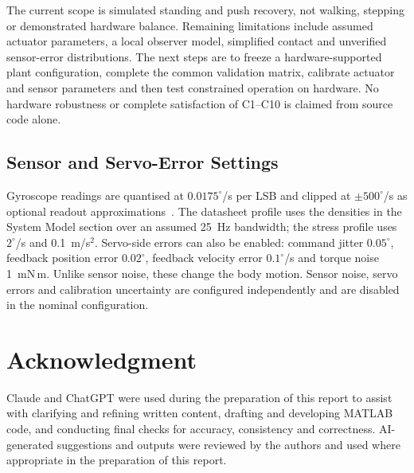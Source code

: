 \documentclass[conference,a4paper]{IEEEtran}
\begin{document}
The current scope is simulated standing and push recovery, not walking,
stepping or demonstrated hardware balance. Remaining limitations include
assumed actuator parameters, a local observer model, simplified contact and
unverified sensor-error distributions. The next steps are to freeze a
hardware-supported plant configuration, complete the common validation
matrix, calibrate actuator and sensor parameters and then test constrained
operation on hardware. No hardware robustness or complete satisfaction of
C1--C10 is claimed from source code alone.

\appendix
\subsection{Sensor and Servo-Error Settings}\label{app:sensors}
Gyroscope readings are quantised at $0.0175^\circ$/s per LSB and clipped at $\pm500^\circ$/s as optional readout approximations~\cite{openmicroduck_params}. The datasheet profile uses the densities in the System Model section over an assumed 25~Hz bandwidth; the stress profile uses $2^\circ$/s and 0.1~m/s$^2$. Servo-side errors can also be enabled: command jitter $0.05^\circ$, feedback position error $0.02^\circ$, feedback velocity error $0.1^\circ$/s and torque noise 1~mN\,m. Unlike sensor noise, these change the body motion. Sensor noise, servo errors and calibration uncertainty are configured independently and are disabled in the nominal configuration.



\section*{Acknowledgment}
Claude and ChatGPT were used during the preparation of this report to assist with clarifying and refining written content, drafting and developing MATLAB code, and conducting final checks for accuracy, consistency and correctness. AI-generated suggestions and outputs were reviewed by the authors and used where appropriate in the preparation of this report.




\end{document}
